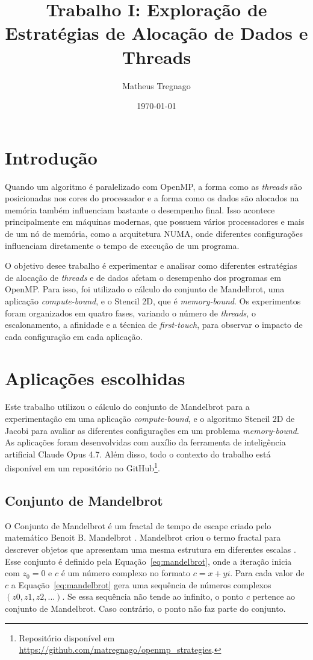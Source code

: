 \documentclass[12pt, letterpaper]{article}
\title{Trabalho I: Exploração de Estratégias de Alocação de Dados e Threads}
\author{Matheus Tregnago}
\date{\today}
\begin{document}
\maketitle

\section{Introdução}

Quando um algoritmo é paralelizado com OpenMP, a forma como as \emph{threads} são posicionadas nos cores do processador e a forma como os dados são alocados na memória também influenciam bastante o desempenho final. Isso acontece principalmente em máquinas modernas, que possuem vários processadores e mais de um nó de memória, como a arquitetura NUMA, onde diferentes configurações influenciam diretamente o tempo de execução de um programa.

O objetivo desee trabalho é experimentar e analisar como diferentes estratégias de alocação de \emph{threads} e de dados afetam o desempenho dos programas em OpenMP. Para isso, foi utilizado o cálculo do conjunto de Mandelbrot, uma aplicação \emph{compute-bound}, e o Stencil 2D, que é \emph{memory-bound}. Os experimentos foram organizados em quatro fases, variando o número de \emph{threads}, o escalonamento, a afinidade e a técnica de \emph{first-touch}, para observar o impacto de cada configuração em cada aplicação.

\section{Aplicações escolhidas}

Este trabalho utilizou o cálculo do conjunto de Mandelbrot para a experimentação em uma aplicação \emph{compute-bound}, e o algoritmo Stencil 2D de Jacobi para avaliar as diferentes configurações em um problema \emph{memory-bound}. As aplicações foram desenvolvidas com auxílio da ferramenta de inteligência artificial Claude Opus 4.7. Além disso, todo o contexto do trabalho está disponível em um repositório no GitHub\footnote{Repositório disponível em \url{https://github.com/matregnago/openmp_strategies}.}.

\subsection{Conjunto de Mandelbrot}

O Conjunto de Mandelbrot é um fractal de tempo de escape criado pelo matemático Benoit B. Mandelbrot \cite{mandelbrot1982}. Mandelbrot criou o termo fractal para descrever objetos que apresentam uma mesma estrutura em diferentes escalas \cite{geometria-fractal-assis2008}. Esse conjunto é definido pela Equação~\ref{eq:mandelbrot}, onde a iteração inicia com $z_0=0$ e $c$ é um número complexo no formato $c = x + yi$. Para cada valor de $c$ a Equação~\ref{eq:mandelbrot} gera uma sequência de números complexos $(z0, z1, z2, ...)$. Se essa sequência não tende ao infinito, o ponto $c$ pertence ao conjunto de Mandelbrot. Caso contrário, o ponto não faz parte do conjunto.
\end{document}
